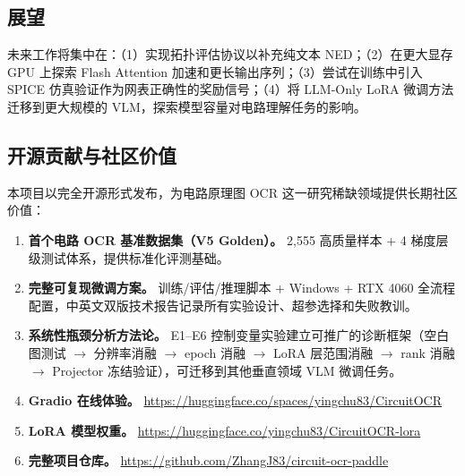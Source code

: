\subsection{展望}

未来工作将集中在：（1）实现拓扑评估协议以补充纯文本 NED；（2）在更大显存 GPU 上探索 Flash Attention 加速和更长输出序列；（3）尝试在训练中引入 SPICE 仿真验证作为网表正确性的奖励信号；（4）将 LLM-Only LoRA 微调方法迁移到更大规模的 VLM，探索模型容量对电路理解任务的影响。

\subsection{开源贡献与社区价值}

本项目以完全开源形式发布，为电路原理图 OCR 这一研究稀缺领域提供长期社区价值：

\begin{enumerate}[nosep]
    \item \textbf{首个电路 OCR 基准数据集（V5 Golden）。} 2,555 高质量样本 + 4 梯度层级测试体系，提供标准化评测基础。
    \item \textbf{完整可复现微调方案。} 训练/评估/推理脚本 + Windows + RTX 4060 全流程配置，中英文双版技术报告记录所有实验设计、超参选择和失败教训。
    \item \textbf{系统性瓶颈分析方法论。} E1--E6 控制变量实验建立可推广的诊断框架（空白图测试 $\to$ 分辨率消融 $\to$ epoch 消融 $\to$ LoRA 层范围消融 $\to$ rank 消融 $\to$ Projector 冻结验证），可迁移到其他垂直领域 VLM 微调任务。
    \item \textbf{Gradio 在线体验。} \url{https://huggingface.co/spaces/yingchu83/CircuitOCR}
    \item \textbf{LoRA 模型权重。} \url{https://huggingface.co/yingchu83/CircuitOCR-lora}
    \item \textbf{完整项目仓库。} \url{https://github.com/ZhangJ83/circuit-ocr-paddle}
\end{enumerate}






